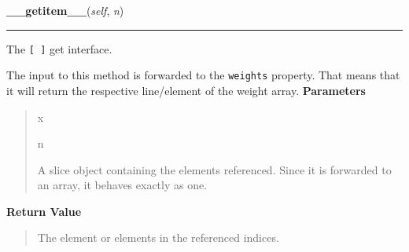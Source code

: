     \vspace{0.5ex}

\hspace{.8\funcindent}\begin{boxedminipage}{\funcwidth}

    \raggedright \textbf{\_\_getitem\_\_}(\textit{self}, \textit{n})

    \vspace{-1.5ex}

    \rule{\textwidth}{0.5\fboxrule}
\setlength{\parskip}{2ex}

The \texttt{{[} {]}} get interface.

The input to this method is forwarded to the \texttt{weights} property. That
means that it will return the respective line/element of the weight
array.
\setlength{\parskip}{1ex}
      \textbf{Parameters}
      \vspace{-1ex}

      \begin{quote}
        \begin{Ventry}{x}

          \item[n]


A slice object containing the elements referenced. Since it is
forwarded to an array, it behaves exactly as one.
        \end{Ventry}

      \end{quote}

      \textbf{Return Value}
    \vspace{-1ex}

      \begin{quote}

The element or elements in the referenced indices.
      \end{quote}

    \end{boxedminipage}

    \vspace{0.5ex}

